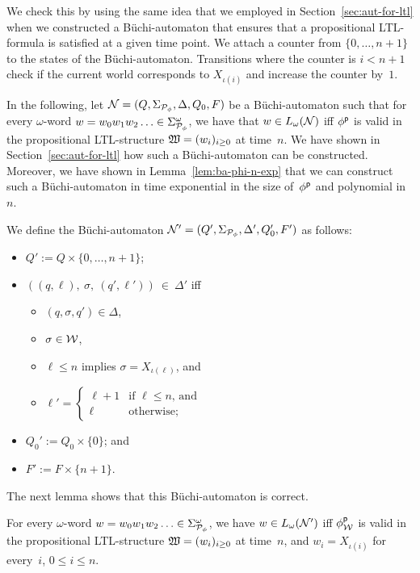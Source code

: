 We check this by using the same idea that we employed in
Section~\ref{sec:aut-for-ltl} when we constructed a Büchi-automaton that ensures
that a propositional LTL-formula is satisfied at a given time point.
%
We attach a counter from $\{0,\dots,n+1\}$ to the states of the
Büchi-automaton.  Transitions where the counter is $i<n+1$ check if the current
world corresponds to $X_{\iota(i)}$ and increase the counter by~$1$.

In the following, let $\mathcal{N}=(Q,\Sigma_{\mathcal{P}_\phi},\Delta,Q_0,F)$ be a
Büchi-automaton such that for every $\omega$-word
$w=w_0w_1w_2\dotso\in\Sigma_{\mathcal{P}_\phi}^\omega$, we have that
$w\in L_\omega(\mathcal{N})$ iff $\phi^\mathsf{p}$ is valid in the propositional
LTL-structure $\mathfrak{W}=(w_i)_{i\ge 0}$ at time~$n$.  We have shown in
Section~\ref{sec:aut-for-ltl} how such a Büchi-automaton can be constructed.
Moreover, we have shown in Lemma~\ref{lem:ba-phi-n-exp} that we can construct
such a Büchi-automaton in time exponential in the size of~$\phi^\mathsf{p}$ and
polynomial in~$n$.

We define the Büchi-automaton $\mathcal{N}'=(Q',\Sigma_{\mathcal{P}_\phi},\Delta',Q_0',F')$ as
follows:
\begin{itemize}
    \item $Q':=Q\times\{0,\dots,n+1\}$;
    \item $((q,\ell),\ \sigma,\ (q',\ell'))\ \in\ \Delta'$ iff
        \begin{itemize}
            \item $(q,\sigma,q')\in\Delta$,
            \item $\sigma\in\mathcal{W}$,
            \item $\ell\le n$ implies $\sigma=X_{\iota(\ell)}$, and
            \item $\ell'=\begin{cases}
                    \ell+1 &\text{if $\ell\le n$, and}\\
                    \ell   &\text{otherwise;}
                \end{cases}$
        \end{itemize}
    \item $Q_0':=Q_0\times\{0\}$; and
    \item $F':=F\times\{n+1\}$.
\end{itemize}
%
The next lemma shows that this Büchi-automaton is correct.

\begin{lemma}
    For every $\omega$-word $w=w_0w_1w_2\dotso\in\Sigma_{\mathcal{P}_\phi}^\omega$, we
    have $w\in L_\omega(\mathcal{N}')$ iff $\phi^\mathsf{p}_\mathcal{W}$ is valid in the
    propositional LTL-structure $\mathfrak{W}=(w_i)_{i\ge 0}$ at time~$n$, and
    $w_i=X_{\iota(i)}$ for every~$i$, $0\le i\le n$.
\end{lemma}

